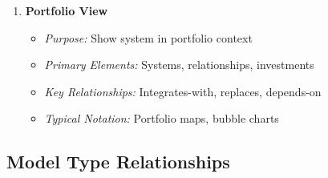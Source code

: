 \documentclass[11pt,letterpaper]{article}
\begin{document}
\begin{enumerate}[label=\textbf{MT\arabic*:}, leftmargin=2.5em]
    \item \textbf{Portfolio View}
    \begin{itemize}[nosep]
        \item \textit{Purpose:} Show system in portfolio context
        \item \textit{Primary Elements:} Systems, relationships, investments
        \item \textit{Key Relationships:} Integrates-with, replaces, depends-on
        \item \textit{Typical Notation:} Portfolio maps, bubble charts
    \end{itemize}
\end{enumerate}

\subsection{Model Type Relationships}
\end{document}
